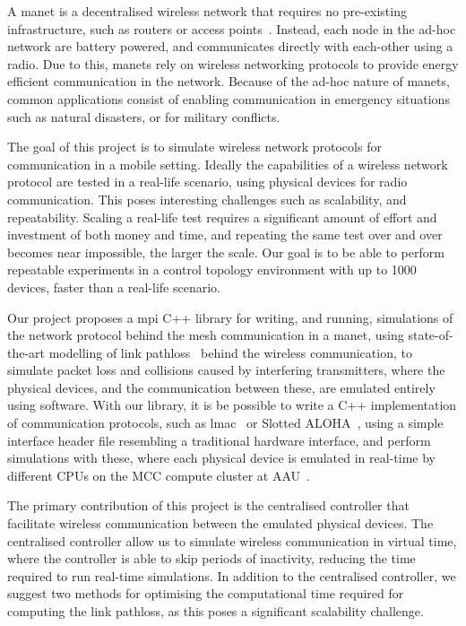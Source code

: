 
A \gls{manet} is a decentralised wireless network that requires no pre-existing infrastructure, such as routers or access points~\cite{inproceedings:routingsurvery}. Instead, each node in the ad-hoc network are battery powered, and communicates directly with each-other using a radio. Due to this, \gls{manet}s rely on wireless networking protocols to provide energy efficient communication in the network. Because of the ad-hoc nature of \gls{manet}s, common applications consist of enabling communication in emergency situations such as natural disasters, or for military conflicts.\smallbreak

The goal of this project is to simulate wireless network protocols for communication in a mobile setting. Ideally the capabilities of a wireless network protocol are tested in a real-life scenario, using physical devices for radio communication. This poses interesting challenges such as scalability, and repeatability. Scaling a real-life test requires a significant amount of effort and investment of both money and time, and repeating the same test over and over becomes near impossible, the larger the scale. Our goal is to be able to perform repeatable experiments in a control topology environment with up to 1000 devices, faster than a real-life scenario.\smallbreak

Our project proposes a \gls{mpi} C++ library for writing, and running, simulations of the network protocol behind the mesh communication in a \gls{manet}, using state-of-the-art modelling of link \gls{pathloss}~\cite{paper:linkmodel} behind the wireless communication, to simulate packet loss and collisions caused by interfering transmitters, where the physical devices, and the communication between these, are emulated entirely using software. With our library, it is be possible to write a C++ implementation of communication protocols, such as \gls{lmac}~\cite{paper:lmac_protocol} or Slotted ALOHA~\cite{Roberts:1975:APS:1024916.1024920}, using a simple interface header file resembling a traditional hardware interface, and perform simulations with these, where each physical device is emulated in real-time by different CPUs on the MCC compute cluster at AAU~\cite{website:mccaau}. \smallbreak

The primary contribution of this project is the centralised controller that facilitate wireless communication between the emulated physical devices. The centralised controller allow us to simulate wireless communication in virtual time, where the controller is able to skip periods of inactivity, reducing the time required to run real-time simulations. In addition to the centralised controller, we suggest two methods for optimising the computational time required for computing the link \gls{pathloss}, as this poses a significant scalability challenge.

\newpage